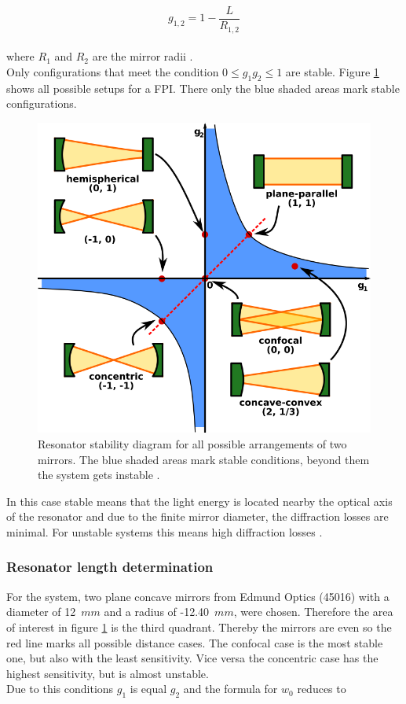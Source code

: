 \begin{equation}
	g_{1,2} = 1-\frac{L}{R_{1,2}} 
	\label{eq:g1g2}
\end{equation}
\\
where $R_1$ and $R_2$ are the mirror radii \cite{eichler:laser}.  \\
Only configurations that meet the condition $0 \leq g_1 g_2 \leq 1$ are stable. Figure \ref{fig:resStability} shows all possible setups for a FPI. There only the blue shaded areas mark stable configurations.  

\begin{figure}[H]
	\centering
	\includegraphics[height=0.4\textheight]{05_OUSD/images/Laser_resonator_stability.png}
	\caption{Resonator stability diagram for all possible arrangements of two mirrors. The blue shaded areas mark stable conditions, beyond them the system gets instable \cite{wiki:resStability}.}
	\label{fig:resStability}
\end{figure} 

In this case stable means that the light energy is located nearby the optical axis of the resonator and due to the finite mirror diameter, the diffraction losses are minimal. For unstable systems this means high diffraction losses \cite{eichler:laser}. 

\subsubsection{Resonator length determination}
\label{sec:resLength}
For the system, two plane concave mirrors from Edmund Optics (45016) with a diameter of 12~$mm$ and a radius of -12.40~$mm$, were chosen. Therefore the area of interest in figure \ref{fig:resStability} is the third quadrant. Thereby the mirrors are even so the red line marks all possible distance cases. The confocal case is the most stable one, but also with the least sensitivity. Vice versa the concentric case has the highest sensitivity, but is almost unstable.\\
Due to this conditions $g_1$ is equal $g_2$ and the formula for $w_0$ reduces to 

